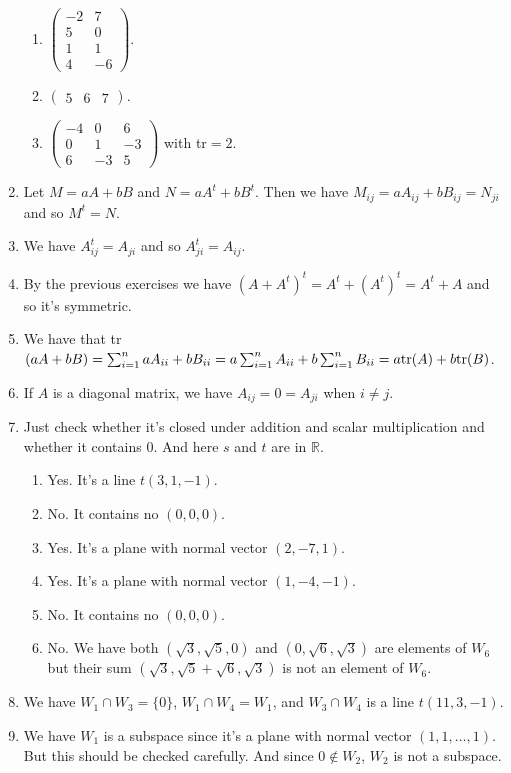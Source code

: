 \begin{enumerate}
\begin{enumerate}
\item $\left(\begin{array}{cc}-2&7\\5&0\\1&1\\4&-6\end{array}\right)$.
\item $\left(\begin{array}{ccc}5&6&7\end{array}\right)$.
\item $\left(\begin{array}{ccc}-4&0&6\\0&1&-3\\6&-3&5\end{array}\right)$ with tr$=2$.
\end{enumerate}
\item Let $M=aA+bB$ and $N=aA^t+bB^t$. Then we have $M_{ij}=aA_{ij}+bB_{ij}=N_{ji}$ and so $M^t=N$.
\item We have $A^t_{ij}=A_{ji}$ and so $A^t_{ji}=A_{ij}$.
\item By the previous exercises we have $(A+A^t)^t=A^t+(A^t)^t=A^t+A$ and so it's symmetric.
\item We have that tr\((aA+bB)=\sum_{i=1}^n{aA_{ii}+bB_{ii}}=a\sum_{i=1}^n{A_{ii}}+b\sum_{i=1}^n{B_{ii}}=a$tr$(A)+b$tr$(B)\).
\item If $A$ is a diagonal matrix, we have $A_{ij}=0=A_{ji}$ when $i\neq j$.
\item Just check whether it's closed under addition and scalar multiplication and whether it contains $0$. And here $s$ and $t$ are in $\mathbb{R}$.
\begin{enumerate}
\item Yes. It's a line $t(3,1,-1)$.
\item No. It contains no $(0,0,0)$.
\item Yes. It's a plane with normal vector $(2,-7,1)$.
\item Yes. It's a plane with normal vector $(1,-4,-1)$.
\item No. It contains no $(0,0,0)$.
\item No. We have both $(\sqrt{3},\sqrt{5},0)$ and $(0,\sqrt{6},\sqrt{3})$ are elements of $W_6$ but their sum $(\sqrt{3},\sqrt{5}+\sqrt{6},\sqrt{3})$ is not an element of $W_6$.
\end{enumerate}
\item We have $W_1 \cap W_3=\{0\}$, $W_1 \cap W_4=W_1$, and $W_3 \cap W_4$ is a line $t(11,3,-1)$.
\item We have $W_1$ is a subspace since it's a plane with normal vector $(1,1,\dots ,1)$. But this should be checked carefully. And since $0\notin W_2$, $W_2$ is not a subspace.

\end{enumerate}
